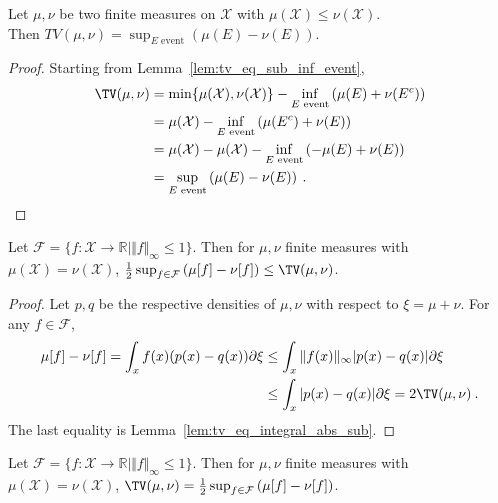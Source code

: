 \begin{theorem}
  \label{thm:tv_eq_sup_sub_measure}
  \uses{}
  Let $\mu, \nu$ be two finite measures on $\mathcal X$ with $\mu(\mathcal X) \leq \nu(\mathcal X)$.\\
  Then $TV(\mu, \nu) = \sup_{E \text{ event}} \left( \mu(E) - \nu(E) \right)$.
\end{theorem}

\begin{proof}%
{}
Starting from Lemma~\ref{lem:tv_eq_sub_inf_event},
\begin{align*}
\TV(\mu, \nu)
&= \min\{\mu(\mathcal X), \nu(\mathcal X)\} - \inf_{E \text{ event}} \left( \mu(E) + \nu(E^c) \right)
\\
&= \mu(\mathcal X) - \inf_{E \text{ event}} \left( \mu(E^c) + \nu(E) \right)
\\
&= \mu(\mathcal X) - \mu(\mathcal X) - \inf_{E \text{ event}} \left( -\mu(E) + \nu(E) \right)
\\
&= \sup_{E \text{ event}} \left( \mu(E) - \nu(E) \right)
\: .
\end{align*}
\end{proof}


\begin{lemma}
  \label{lem:tv_eq_sup_aux}
  Let $\mathcal F = \{f : \mathcal X \to \mathbb{R} \mid \Vert f \Vert_\infty \le 1\}$.
  Then for $\mu, \nu$ finite measures with $\mu(\mathcal X) = \nu(\mathcal X)$, $\frac{1}{2} \sup_{f \in \mathcal F} \left( \mu[f] - \nu[f] \right) \le \TV(\mu, \nu)$.
\end{lemma}

\begin{proof}
Let $p,q$ be the respective densities of $\mu, \nu$ with respect to $\xi=\mu+\nu$.
For any $f \in \mathcal F$,
\begin{align*}
\mu[f] - \nu[f]
= \int_x f(x)(p(x) - q(x)) \partial\xi
&\le \int_x \Vert f(x) \Vert_\infty \vert p(x) - q(x) \vert \partial\xi
\\
&\le \int_x \vert p(x) - q(x) \vert \partial\xi
= 2 \TV(\mu, \nu)
\: .
\end{align*}
The last equality is Lemma~\ref{lem:tv_eq_integral_abs_sub}.
\end{proof}


\begin{theorem}
  \label{thm:tv_eq_sup_sub_integral}
  Let $\mathcal F = \{f : \mathcal X \to \mathbb{R} \mid \Vert f \Vert_\infty \le 1\}$.
  Then for $\mu, \nu$ finite measures with $\mu(\mathcal X) = \nu(\mathcal X)$, $\TV(\mu, \nu) = \frac{1}{2} \sup_{f \in \mathcal F} \left( \mu[f] - \nu[f] \right)$.
\end{theorem}

